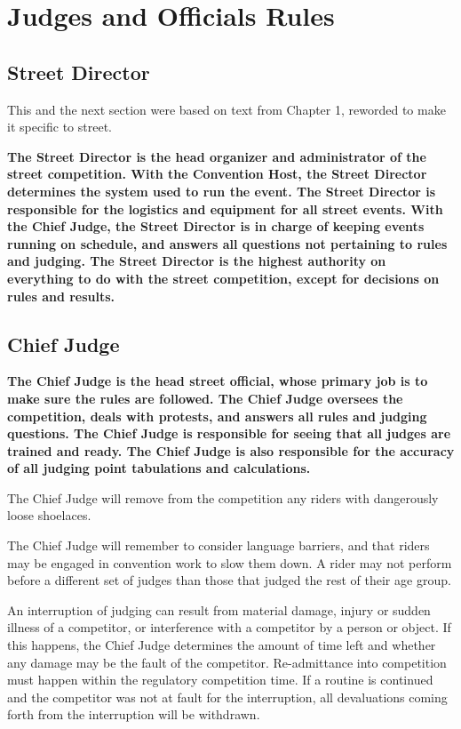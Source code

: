 \chapter{Judges and Officials Rules}

\section{Street Director}

\begin{framed}
This and the next section were based on text from Chapter 1, reworded to make it specific to street.
\end{framed}

\textbf{The Street Director is the head organizer and administrator of the street
competition.  With the Convention Host, the Street Director determines the system used to run the event.
The Street Director is responsible for the logistics and
equipment for all street events.  With the Chief Judge, the
Street Director is in charge of keeping events running on schedule, and
answers all questions not pertaining to rules and judging.  The Street
Director is the highest authority on everything to do with the street
competition, except for decisions on rules and results.}

\section{Chief Judge}

\textbf{The Chief Judge is the head street official, whose primary job is to make sure the rules are followed. The Chief Judge oversees the competition, deals with protests, and answers all rules and judging questions.
The Chief Judge is responsible for seeing that all judges are trained and ready. The Chief Judge is also responsible for the accuracy of all judging point tabulations and calculations.}

The Chief Judge will remove from the competition any riders with dangerously loose shoelaces. 

The Chief Judge will remember to consider language barriers, and that riders may be engaged in convention work to slow them down.
A rider may not perform before a different set of judges than those that judged the rest of their age group.

An interruption of judging can result from material damage, injury or sudden illness of a competitor, or interference with a competitor by a person or object.
If this happens, the Chief Judge determines the amount of time left and whether any damage may be the fault of the competitor.
Re-admittance into competition must happen within the regulatory competition time.
If a routine is continued and the competitor was not at fault for the interruption, all devaluations coming forth from the interruption will be withdrawn.

